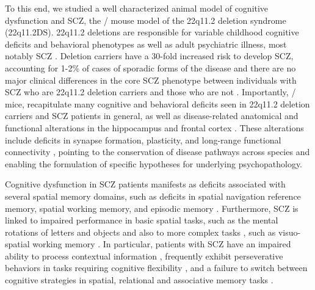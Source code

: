 To this end, we studied a well characterized animal model of cognitive dysfunction and SCZ, the \df/ mouse model of the 22q11.2 deletion syndrome (22q11.2DS). 22q11.2 deletions are responsible for variable childhood cognitive deficits and behavioral phenotypes as well as adult psychiatric illness, most notably SCZ \citep{Biswas2016, Schneider2014}. Deletion carriers have a 30-fold increased risk to develop SCZ, accounting for 1-2\% of cases of sporadic forms of the disease \citep{Karayiorgou2010, Xu2008} and there are no major clinical differences in the core SCZ phenotype between individuals with SCZ who are 22q11.2 deletion carriers and those who are not \citep{Bassett2003, Bassett1998}. Importantly, \df/ mice, recapitulate many cognitive and behavioral deficits seen in 22q11.2 deletion carriers and SCZ patients in general, as well as disease-related anatomical and functional alterations in the hippocampus and frontal cortex \citep{Glausier2013, Scariati2016, Schmitt2015, Schmitt2016, Spencer2004, Uhlhaas2010, Weinberger2016}. These alterations include deficits in synapse formation, plasticity, and long-range functional connectivity \citep{Drew2011b, Mukai2008, Stark2008, Fenelon2013, Mukai2015, Sigurdsson2010, Tamura2016}, pointing to the conservation of disease pathways across species and enabling the formulation of specific hypotheses for underlying psychopathology.

Cognitive dysfunction in SCZ patients manifests as deficits associated with several spatial memory domains, such as deficits in spatial navigation reference memory, spatial working memory, and episodic memory \citep{Hanlon2006, Piskulic2007, Ranganath2008, Schaefer2013, Wilkins2013}. Furthermore, SCZ is linked to impaired performance in basic spatial tasks, such as the mental rotations of letters and objects \citep{DeVignemont2006} and also to more complex tasks \citep{Landgraf2011, Weniger2008}, such as visuo-spatial working memory \citep[see review][]{Piskulic2007}. In particular, patients with SCZ have an impaired ability to process contextual information \citep{Barch2003, Cohen1999, Maren2013}, frequently exhibit perseverative behaviors in tasks requiring cognitive flexibility \citep{Crider1997, Leeson2009, Morice1990}, and a failure to switch between cognitive strategies in spatial, relational and associative memory tasks \citep{Armstrong2012, Hanlon2006, Sheffield2012, Wilkins2013}.

